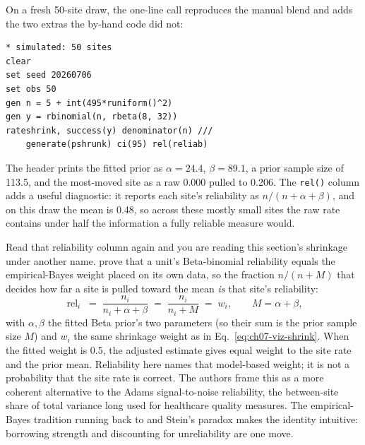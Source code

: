 \documentclass[
    a4paper,
    fontsize=10pt,
    twoside=true,
    numbers=noenddot,
]{kaobook}
\begin{document}
On a fresh 50-site draw, the one-line call reproduces the manual blend and adds the two extras the by-hand code did not:
\par
{\footnotesize
\begin{verbatim}
* simulated: 50 sites
clear
set seed 20260706
set obs 50
gen n = 5 + int(495*runiform()^2)
gen y = rbinomial(n, rbeta(8, 32))
rateshrink, success(y) denominator(n) ///
    generate(pshrunk) ci(95) rel(reliab)
\end{verbatim}
}
The header prints the fitted prior as $\alpha=24.4$, $\beta=89.1$, a prior sample size of 113.5, and the most-moved site as a raw 0.000 pulled to 0.206. The \texttt{rel()} column adds a useful diagnostic: it reports each site's reliability as $n/(n+\alpha+\beta)$, and on this draw the mean is 0.48, so across these mostly small sites the raw rate contains under half the information a fully reliable measure would.

Read that reliability column again and you are reading this section's shrinkage under another name. \textcite{field2026betabin} prove that a unit's Beta-binomial reliability equals the empirical-Bayes weight placed on its own data, so the fraction $n/(n+M)$ that decides how far a site is pulled toward the mean \emph{is} that site's reliability:
\begin{equation}
  \operatorname{rel}_i
    \;=\; \frac{n_i}{n_i + \alpha + \beta}
    \;=\; \frac{n_i}{n_i + M}
    \;=\; w_i,
  \qquad M = \alpha + \beta,
  \label{eq:ch07-viz-relid}
\end{equation}
with $\alpha,\beta$ the fitted Beta prior's two parameters (so their sum is the prior sample size $M$) and $w_i$ the same shrinkage weight as in Eq.~\eqref{eq:ch07-viz-shrink}. When the fitted weight is 0.5, the adjusted estimate gives equal weight to the site rate and the prior mean. Reliability here names that model-based weight; it is not a probability that the site rate is correct. The authors frame this as a more coherent alternative to the Adams signal-to-noise reliability, the between-site share of total variance long used for healthcare quality measures. The empirical-Bayes tradition running back to \textcite{efron1975data} and Stein's paradox makes the identity intuitive: borrowing strength and discounting for unreliability are one move.
\end{document}
